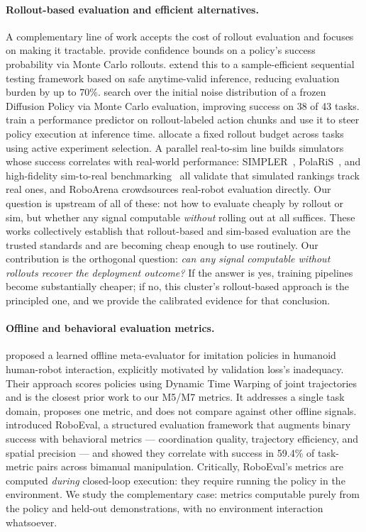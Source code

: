 \paragraph{Rollout-based evaluation and efficient alternatives.}
A complementary line of work accepts the cost of rollout evaluation and focuses on making
it tractable. \citet{vincent2024stochastic} provide confidence bounds on a policy's success
probability via Monte Carlo rollouts. \citet{snyder2026binary} extend this to a
sample-efficient sequential testing framework based on safe anytime-valid inference,
reducing evaluation burden by up to 70\%. \citet{patil2026golden} search over the initial
noise distribution of a frozen Diffusion Policy via Monte Carlo evaluation, improving
success on 38 of 43 tasks. \citet{wang2026ppguide} train a performance predictor on
rollout-labeled action chunks and use it to steer policy execution at inference time.
\citet{anwar2025} allocate a fixed rollout budget across tasks using active experiment
selection. A parallel real-to-sim line builds simulators whose success correlates with real-world
performance: SIMPLER~\citep{li2024simpler}, PolaRiS~\citep{polaris2025}, and high-fidelity
sim-to-real benchmarking~\citep{nvidia2025eval} all validate that simulated rankings track real
ones, and RoboArena crowdsources real-robot evaluation directly. Our question is upstream of all of
these: not how to evaluate cheaply by rollout or sim, but whether any signal computable
\emph{without} rolling out at all suffices. These works collectively establish that
rollout-based and sim-based evaluation are the trusted standards and are becoming cheap enough to
use routinely. Our contribution is the orthogonal
question: \emph{can any signal computable without rollouts recover the deployment outcome?}
If the answer is yes, training pipelines become substantially cheaper; if no, this cluster's
rollout-based approach is the principled one, and we provide the calibrated evidence for
that conclusion.

\paragraph{Offline and behavioral evaluation metrics.}
\citet{tiezzi2025neme} proposed a learned offline meta-evaluator for imitation policies in
humanoid human-robot interaction, explicitly motivated by validation loss's inadequacy. Their
approach scores policies using Dynamic Time Warping of joint trajectories and is the closest
prior work to our M5/M7 metrics. It addresses a single task domain, proposes one metric, and
does not compare against other offline signals. \citet{wang2025roboeval} introduced
RoboEval, a structured evaluation framework that augments binary success with behavioral
metrics --- coordination quality, trajectory efficiency, and spatial precision --- and
showed they correlate with success in 59.4\% of task-metric pairs across bimanual
manipulation. Critically, RoboEval's metrics are computed \emph{during} closed-loop
execution: they require running the policy in the environment. We study the complementary
case: metrics computable purely from the policy and held-out demonstrations, with no
environment interaction whatsoever.


